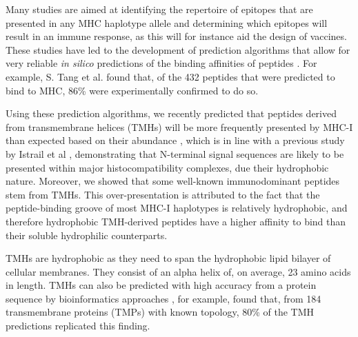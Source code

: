 
Many studies are aimed at identifying the repertoire of epitopes that are presented 
in any MHC haplotype allele and determining which epitopes will result in an immune response, 
as this will for instance aid the design of vaccines. 
These studies have led to the development of prediction algorithms 
that allow for very reliable \emph{in silico} predictions 
of the binding affinities of peptides
\cite{larsen2010identification,schellens2008unanticipated,tang2011genome}.
For example, S. Tang et al. \cite{tang2011genome} found that, 
of the 432 peptides that were predicted to bind to MHC,
86\% were experimentally confirmed to do so. 


Using these prediction algorithms, 
we recently predicted that peptides derived 
from transmembrane helices (TMHs) 
will be more frequently presented by MHC-I 
than expected based on their abundance \cite{bianchi2017},
which is in line with a previous study 
by Istrail et al \cite{istrail2004comparative},
demonstrating that N-terminal signal sequences 
are likely to be presented within major histocompatibility complexes, 
due their hydrophobic nature. 
Moreover, we showed that some well-known immunodominant peptides stem from TMHs. 
This over-presentation is attributed to the fact 
that the peptide-binding groove of most MHC-I haplotypes 
is relatively hydrophobic, 
and therefore hydrophobic TMH-derived peptides have a higher affinity 
to bind than their soluble hydrophilic counterparts. 

TMHs are hydrophobic 
as they need to span the hydrophobic lipid bilayer of cellular membranes.
They consist of an alpha helix of, on average, 23 amino acids in length. 
TMHs can also be predicted with high accuracy from a protein sequence 
by bioinformatics approaches \cite{krogh2001predicting,kall2004combined,arai2004conpred,jones2007improving,klammer2009metatm,wang2019efficient},
for example, \cite{jones2007improving} found that,
from 184 transmembrane proteins (TMPs) with known topology, 
80\% of the TMH predictions replicated this finding.
 
